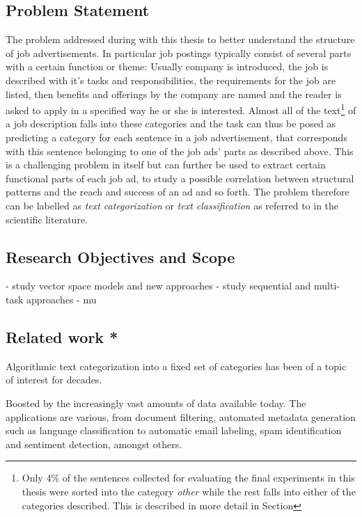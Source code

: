 \subsection{Problem Statement}

The problem addressed during with this thesis to better understand the structure of job advertisements. In particular job postings typically consist of several parts with a certain function or theme: Usually company is introduced, the job is described with it's tasks and responsibilities, the requirements for the job are listed, then benefits and offerings by the company are named and the reader is asked to apply in a specified way he or she is interested.
Almost all of the text\footnote{Only 4\% of the sentences collected for evaluating the final experiments in this thesis were sorted into the category \emph{other} while the rest falls into either of the categories described. This is described in more detail in Section } of a job description falls into these categories and the task can thus be posed as predicting a category for each sentence in a job advertisement, that corresponds with this sentence belonging to one of the job ads' parts as described above. This is a challenging problem in itself but can further be used to extract certain functional parts of each job ad, to study a possible correlation between structural patterns and the reach and success of an ad and so forth. The problem therefore can be labelled as \emph{text categorization} or \emph{text classification} as referred to in the scientific literature.

\subsection{Research Objectives and Scope}

- study vector space models and new approaches
- study sequential and multi-task approaches
- mu


\subsection{Related work *}


Algorithmic text categorization into a fixed set of categories has been of a topic of interest for decades.

 Boosted by the increasingly vast amounts of data available today. The applications are various, from document filtering, automated metadata generation such as language classification to automatic email labeling, spam identification and sentiment detection, amongst others.

